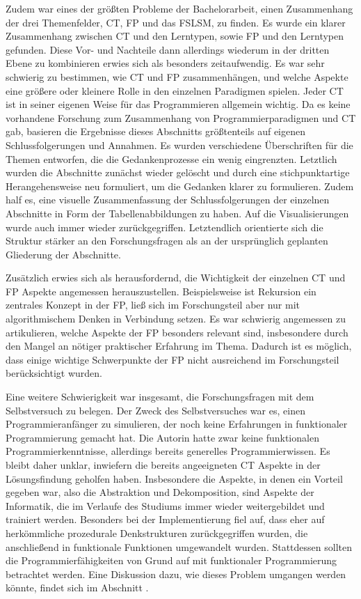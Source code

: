 Zudem war eines der größten Probleme der Bachelorarbeit, einen Zusammenhang der drei Themenfelder, CT, FP und das FSLSM, zu finden. Es wurde ein klarer Zusammenhang zwischen CT und den Lerntypen, sowie FP und den Lerntypen gefunden. Diese Vor- und Nachteile dann allerdings wiederum in der dritten Ebene zu kombinieren erwies sich als besonders zeitaufwendig.
Es war sehr schwierig zu bestimmen, wie CT und FP zusammenhängen, und welche Aspekte eine größere oder kleinere Rolle in den einzelnen Paradigmen spielen. Jeder CT ist in seiner eigenen Weise für das Programmieren allgemein wichtig.
Da es keine vorhandene Forschung zum Zusammenhang von Programmierparadigmen und CT gab, basieren die Ergebnisse dieses Abschnitts größtenteils auf eigenen Schlussfolgerungen und Annahmen.
Es wurden verschiedene Überschriften für die Themen entworfen, die die Gedankenprozesse ein wenig eingrenzten. Letztlich wurden die Abschnitte zunächst wieder gelöscht und durch eine stichpunktartige Herangehensweise neu formuliert, um die Gedanken klarer zu formulieren. Zudem half es, eine visuelle Zusammenfassung der Schlussfolgerungen der einzelnen Abschnitte in Form der Tabellenabbildungen zu haben. Auf die Visualisierungen wurde auch immer wieder zurückgegriffen.
Letztendlich orientierte sich die Struktur stärker an den Forschungsfragen als an der ursprünglich geplanten Gliederung der Abschnitte.

Zusätzlich erwies sich als herausfordernd, die Wichtigkeit der einzelnen CT und FP Aspekte angemessen herauszustellen. Beispielsweise ist Rekursion ein zentrales Konzept in der FP, ließ sich im Forschungsteil aber nur mit algorithmischem Denken in Verbindung setzen. Es war schwierig angemessen zu artikulieren, welche Aspekte der FP besonders relevant sind, insbesondere durch den Mangel an nötiger praktischer Erfahrung im Thema. Dadurch ist es möglich, dass einige wichtige Schwerpunkte der FP nicht ausreichend im Forschungsteil berücksichtigt wurden.

Eine weitere Schwierigkeit war insgesamt, die Forschungsfragen mit dem Selbstversuch zu belegen. Der Zweck des Selbstversuches war es, einen Programmieranfänger zu simulieren, der noch keine Erfahrungen in funktionaler Programmierung gemacht hat. Die Autorin hatte zwar keine funktionalen Programmierkenntnisse, allerdings bereits generelles Programmierwissen. Es bleibt daher unklar, inwiefern die bereits angeeigneten CT Aspekte in der Lösungsfindung geholfen haben. Insbesondere die Aspekte, in denen ein Vorteil gegeben war, also die Abstraktion und Dekomposition, sind Aspekte der Informatik, die im Verlaufe des Studiums immer wieder weitergebildet und trainiert werden.
Besonders bei der Implementierung fiel auf, dass eher auf herkömmliche prozedurale Denkstrukturen zurückgegriffen wurden, die anschließend in funktionale Funktionen umgewandelt wurden.
Stattdessen sollten die Programmierfähigkeiten von Grund auf mit funktionaler Programmierung betrachtet werden. Eine Diskussion dazu, wie dieses Problem umgangen werden könnte, findet sich im Abschnitt .

